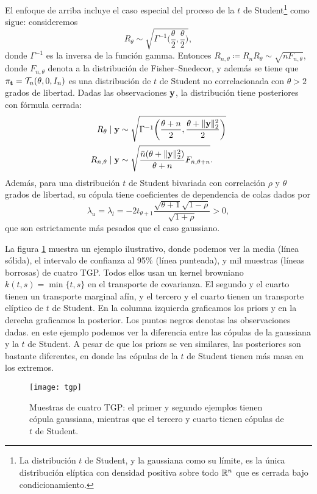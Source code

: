 El enfoque de arriba incluye el caso especial del proceso de la \(t\) de Student\footnote{La distribución \(t\) de Student, y la gaussiana como su límite, es la única distribución elíptica con densidad positiva sobre todo \(\mathbb{R}^n\) que es cerrada bajo condicionamiento\cite{stoeber2013simplified}.} como sigue: consideremos
\[R_\theta \sim \sqrt{\Gamma^{-1} \biggl(\frac{\theta}{2}, \frac{\theta}{2}\biggr)},\]
donde \(\Gamma^{-1}\) es la inversa de la función gamma. Entonces \(R_{n, \theta} \coloneqq R_n R_{\theta} \sim \sqrt{n F_{n, \theta}}\), donde \(F_{n, \theta}\) denota a la distribución de Fisher–Snedecor, y además se tiene que \(\pi_{\mathbf{t}} = \mathcal{T}_{n}(\theta, 0 , I_n)\) es una distribución de \(t\) de Student no correlacionada con \(\theta > 2\) grados de libertad. Dadas las observaciones \(\mathbf{y}\), la distribución tiene posteriores con fórmula cerrada:
\begin{align*}
R_\theta \mid \mathbf{y}			&\sim \sqrt{\Gamma^{-1}\biggl(\frac{\theta+n}{2}, \frac{\theta + \lVert \mathbf{y} \rVert_2^2}{2}\biggr)}\\
R_{\bar{n}, \theta} \mid \mathbf{y}	&\sim \sqrt{\frac{\bar{n}(\theta + \lVert \mathbf{y} \rVert_2^2)}{\theta + n} F_{\bar{n},\theta+n}}.
\end{align*}
Además, para una distribución \(t\) de Student bivariada con correlación \(\rho\) y \(\theta\) grados de libertad, su cópula tiene coeficientes de dependencia de colas dados por
\[\lambda_{u} = \lambda_{l} = - 2t_{\theta + 1} \frac{\sqrt{\theta + 1} \sqrt{1-\rho}}{\sqrt{1 + \rho}} > 0,\]
que son estrictamente más pesados que el caso gaussiano.

La figura \ref{fig_tgp1}  muestra un ejemplo ilustrativo, donde podemos ver la media (línea sólida), el intervalo de confianza al 95\% (línea punteada), y mil muestras (líneas borrosas) de cuatro TGP. Todos ellos usan un kernel browniano \(k(t, s) = \min\{t, s\}\) en el transporte de covarianza. El segundo y el cuarto tienen un transporte marginal afín, y el tercero y el cuarto tienen un transporte elíptico de \(t\) de Student. En la columna izquierda graficamos los priors y en la derecha graficamos la posterior. Los puntos negros denotas las observaciones dadas. en este ejemplo podemos ver la diferencia entre las cópulas de la gaussiana y la \(t\) de Student. A pesar de que los priors se ven similares, las posteriores son bastante diferentes, en donde las cópulas de la \(t\) de Student tienen más masa en los extremos.

\begin{figure}[h]
	\centering
	\texttt{[image: tgp]}
	\caption{Muestras de cuatro TGP: el primer y segundo ejemplos tienen cópula gaussiana, mientras que el tercero y cuarto tienen cópulas de \(t\) de Student.}
	\label{fig_tgp1}
\end{figure}


